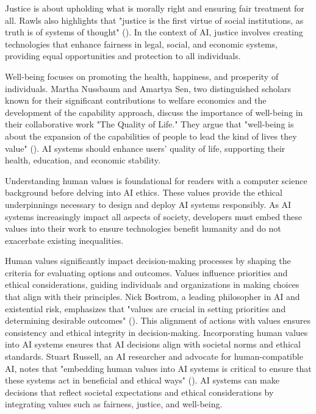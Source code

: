 \documentclass[
  letterpaper,
  DIV=11,
  numbers=noendperiod,
  oneside]{scrreprt}
\theoremstyle{remark}
\begin{document}
Justice is about upholding what is morally right and ensuring fair
treatment for all. Rawls also highlights that "justice is the first
virtue of social institutions, as truth is of systems of thought"
(). In the context of AI,
justice involves creating technologies that enhance fairness in legal,
social, and economic systems, providing equal opportunities and
protection to all individuals.

Well-being focuses on promoting the health, happiness, and prosperity of
individuals. Martha Nussbaum and Amartya Sen, two distinguished scholars
known for their significant contributions to welfare economics and the
development of the capability approach, discuss the importance of
well-being in their collaborative work "The Quality of Life." They argue
that "well-being is about the expansion of the capabilities of people to
lead the kind of lives they value"
(). AI systems
should enhance users' quality of life, supporting their health,
education, and economic stability.

Understanding human values is foundational for readers with a computer
science background before delving into AI ethics. These values provide
the ethical underpinnings necessary to design and deploy AI systems
responsibly. As AI systems increasingly impact all aspects of society,
developers must embed these values into their work to ensure
technologies benefit humanity and do not exacerbate existing
inequalities.

Human values significantly impact decision-making processes by shaping
the criteria for evaluating options and outcomes. Values influence
priorities and ethical considerations, guiding individuals and
organizations in making choices that align with their principles. Nick
Bostrom, a leading philosopher in AI and existential risk, emphasizes
that "values are crucial in setting priorities and determining desirable
outcomes" ().
This alignment of actions with values ensures consistency and ethical
integrity in decision-making. Incorporating human values into AI systems
ensures that AI decisions align with societal norms and ethical
standards. Stuart Russell, an AI researcher and advocate for
human-compatible AI, notes that "embedding human values into AI systems
is critical to ensure that these systems act in beneficial and ethical
ways" (). AI systems can
make decisions that reflect societal expectations and ethical
considerations by integrating values such as fairness, justice, and
well-being.
\end{document}
